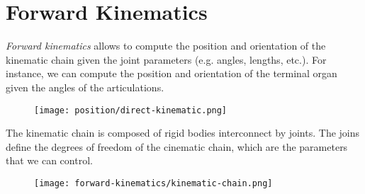 \section{Forward Kinematics}
\emph{Forward kinematics} allows to compute the position and orientation of the kinematic chain given the joint parameters (e.g. angles, lengths, etc.). For instance, we can compute the position and orientation of the terminal organ given the angles of the articulations.
\begin{figure}[H]
    \centering
    \texttt{[image: position/direct-kinematic.png]}
\end{figure}

The kinematic chain is composed of rigid bodies interconnect by joints. The joins define the degrees of freedom of the cinematic chain, which are the parameters that we can control.
\begin{figure}[H]
    \centering
    \texttt{[image: forward-kinematics/kinematic-chain.png]}
\end{figure}